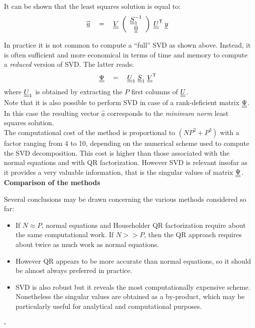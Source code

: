 {  It can be shown that the least squares solution is equal to:
  \begin{align*}
    \widehat{\underline{a}} \quad = \quad \underline{\underline{V}} \; \left( \begin{array}{c}
      \underline{\underline{S}}_1^{-1} \\
      \underline{\underline{0}}  \\
    \end{array}\right)
    \; \underline{\underline{U}}^{\mbox{\scriptsize \textsf{T}}} \; \underline{y}
  \end{align*}

  In practice it is not common to compute a ``full'' SVD as shown above. Instead, it is often sufficient and more economical in terms of time and memory to compute a \emph{reduced} version of SVD. The latter reads:
  \begin{align*}
    \underline{\underline{\Psi}} \quad = \quad \underline{\underline{U}}_1 \; \underline{\underline{S}}_1 \; \underline{\underline{V}}^{\mbox{\scriptsize \textsf{T}}}
  \end{align*}
  where $\underline{\underline{U}}_1$ is obtained by extracting the $P$ first columns of $\underline{\underline{U}}$.\\

  Note that it is also possible to perform SVD in case of a rank-deficient matrix $\underline{\underline{\Psi}}$. In this case the resulting vector $\widehat{\underline{a}}$ corresponds to the \emph{minimum norm} least squares solution. \\

  The computational cost of the method is proportional to $(NP^2 + P^3)$ with a factor ranging from 4 to 10, depending on the numerical scheme used to compute the SVD decomposition. This cost is higher than those associated with the normal equations and with QR factorization. However SVD is relevant insofar as it provides a very valuable information, that is the singular values of matrix $\underline{\underline{\Psi}}$. \\

  \textbf{Comparison of the methods} \vspace{2mm}

  Several conclusions may be drawn concerning the various methods considered so far:
  \begin{itemize}
  \item If $N \approx P$, normal equations and Householder QR factorization require about the same computational work. If $N >> P$, then the QR approach requires about twice as much work as normal equations.
  \item However QR appears to be more accurate than normal equations, so it should be almost always preferred in practice.
  \item SVD is also robust but it reveals the most computationally expensive scheme. Nonetheless the singular values are obtained as a by-product, which may be particularly useful for analytical and computational purposes.
  \end{itemize}

}
{-
}

